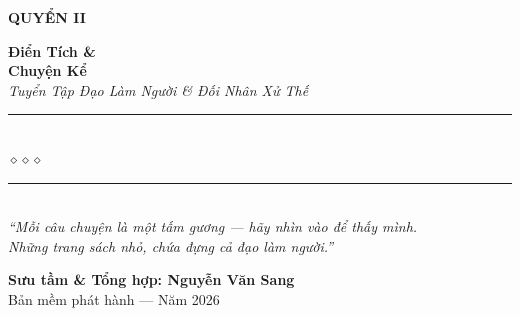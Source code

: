 \begin{titlepage}
\begin{center}
  \begin{tcolorbox}[
    width=6.5cm,
    colback=truyengold!20,
    colframe=truyengold!80!black,
    arc=4pt,
    boxrule=1.5pt,
    halign=center
  ]
    {\fontsize{18}{22}\selectfont\bfseries\color{truyenred!80!black}
     QUYỂN II}
  \end{tcolorbox}
  \vspace{0.8cm}

  {\fontsize{42}{50}\selectfont\bfseries\color{truyenred!80!black}
    Điển Tích \&}\\[0.4cm]
  {\fontsize{38}{45}\selectfont\bfseries\color{truyenred!80!black}
    Chuyện Kể}\\[0.8cm]

  {\fontsize{18}{22}\selectfont\color{truyengold!90!black}\itshape
    Tuyển Tập Đạo Làm Người \& Đối Nhân Xử Thế}\\[1cm]

  {\color{truyenblue!60}\rule{6cm}{1pt}}\\[5pt]
  {\color{truyengold!80!black}\large$\diamond$\hspace{1cm}$\diamond$\hspace{1cm}$\diamond$}\\[5pt]
  {\color{truyenblue!60}\rule{6cm}{1pt}}\\[1.5cm]

  {\normalsize\itshape\color{truyenblue!90!black}
   ``Mỗi câu chuyện là một tấm gương — hãy nhìn vào để thấy mình.\\
   Những trang sách nhỏ, chứa đựng cả đạo làm người.''}

  \vfill

  {\fontsize{16}{20}\selectfont\bfseries\color{truyenblue!90!black}
    Sưu tầm \& Tổng hợp: \textbf{Nguyễn Văn Sang}}\\[0.4cm]

  {\small\color{gray} Bản mềm phát hành --- Năm 2026}\\[0.5cm]
\end{center}

\afterpage{\nopagecolor}
\end{titlepage}
